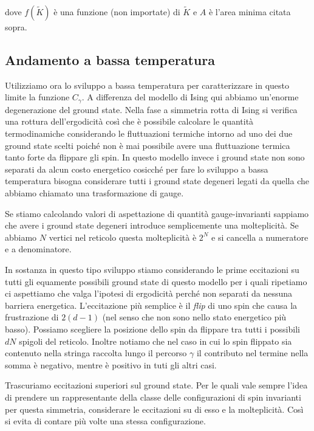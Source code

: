 \documentclass[12pt,a4paper]{article}
\begin{document}
dove $f(\tilde{K})$ è una funzione (non importate) di $\tilde{K}$ e $A$ è l'area minima citata sopra.

\subsection{Andamento a bassa temperatura}
Utilizziamo ora lo sviluppo a bassa temperatura per caratterizzare in questo limite la funzione $C_{\gamma}$. A differenza del modello di Ising qui abbiamo un'enorme degenerazione del ground state. Nella fase a simmetria rotta di Ising si verifica una rottura dell'ergodicità così che è possibile calcolare le quantità termodinamiche considerando le fluttuazioni termiche intorno ad uno dei due ground state scelti poiché non è mai possibile avere una fluttuazione termica tanto forte da flippare gli spin. In questo modello invece i ground state non sono separati da alcun costo energetico cosicché per fare lo sviluppo a bassa temperatura bisogna considerare tutti i ground state degeneri legati da quella che abbiamo chiamato una trasformazione di gauge.

Se stiamo calcolando valori di aspettazione di quantità gauge-invarianti sappiamo che avere i ground state degeneri introduce semplicemente una molteplicità. Se abbiamo $N$ vertici nel reticolo questa molteplicità è $2^N$ e si cancella a numeratore e a denominatore.

In sostanza in questo tipo sviluppo stiamo considerando le prime eccitazioni su tutti gli equamente possibili ground state di questo modello per i quali ripetiamo ci aspettiamo che valga l'ipotesi di ergodicità perché non separati da nessuna barriera energetica. L'eccitazione più semplice è il \emph{flip} di uno spin che causa la frustrazione di $2(d-1)$ (nel senso che non sono nello stato energetico più basso). Possiamo scegliere la posizione dello spin da flippare tra tutti i possibili $dN$ spigoli del reticolo.
Inoltre notiamo che nel caso in cui lo spin flippato sia contenuto nella stringa raccolta lungo il percorso $\gamma$ il contributo nel termine nella somma è negativo, mentre è positivo in tuti gli altri casi.

Trascuriamo eccitazioni superiori sul ground state. Per le quali vale sempre l'idea di prendere un rappresentante della classe delle configurazioni di spin invarianti per questa simmetria, considerare le eccitazioni su di esso e la molteplicità. Così si evita di contare più volte una stessa configurazione.  

\end{document}
